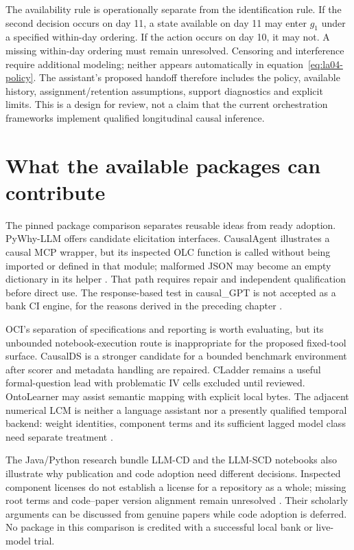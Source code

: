 The availability rule is operationally separate from the identification rule.
If the second decision occurs on day 11, a state available on day 11 may enter
$g_1$ under a specified within-day ordering. If the action occurs on day 10, it
may not. A missing within-day ordering must remain unresolved. Censoring and
interference require additional modeling; neither appears automatically in
equation~\eqref{eq:la04-policy}. The assistant's proposed handoff therefore
includes the policy, available history, assignment/retention assumptions,
support diagnostics and explicit limits. This is a design for review, not a
claim that the current orchestration frameworks implement qualified
longitudinal causal inference.

\section{What the available packages can contribute}

The pinned package comparison separates reusable ideas from ready adoption.
PyWhy-LLM offers candidate elicitation interfaces. CausalAgent illustrates a
causal MCP wrapper, but its inspected OLC function is called without being
imported or defined in that module; malformed JSON may become an empty
dictionary in its helper \cite{v12_la_package_causalagent}. That path requires
repair and independent qualification before direct use. The response-based
test in causal\_GPT is not accepted as a bank CI engine, for the reasons derived
in the preceding chapter \cite{v12_la_package_causal_gpt}.

OCI's separation of specifications and reporting is worth evaluating, but its
unbounded notebook-execution route is inappropriate for the proposed fixed-tool
surface. CausalDS is a stronger candidate for a bounded benchmark environment
after scorer and metadata handling are repaired. CLadder remains a useful
formal-question lead with problematic IV cells excluded until reviewed.
OntoLearner may assist semantic mapping with explicit local bytes. The adjacent
numerical LCM is neither a language assistant nor a presently qualified temporal
backend: weight identities, component terms and its sufficient lagged model
class need separate treatment \cite{v12_la_package_lcm}.

The Java/Python research bundle LLM-CD and the LLM-SCD notebooks also illustrate
why publication and code adoption need different decisions. Inspected component
licenses do not establish a license for a repository as a whole; missing
root terms and code--paper version alignment remain unresolved
\cite{v12_la_package_llm_cd,v12_la_package_llm_scd}. Their scholarly arguments can
be discussed from genuine papers while code adoption is deferred. No package
in this comparison is credited with a successful local bank or live-model trial.

